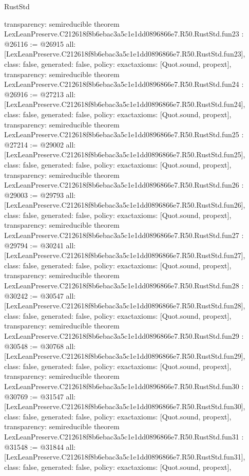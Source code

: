 \begin{lexlean}{RustStd}
\begin{coremodule}
{  transparency: semireducible
}
theorem LexLeanPreserve.C212618f8b6ebac3a5c1e1dd0896866e7.R50.RustStd.fun23 : @26116 := @26915 {
  all: [LexLeanPreserve.C212618f8b6ebac3a5c1e1dd0896866e7.R50.RustStd.fun23],
  class: false,
  generated: false,
  policy: exact{axioms: [Quot.sound, propext]},
  transparency: semireducible
}
theorem LexLeanPreserve.C212618f8b6ebac3a5c1e1dd0896866e7.R50.RustStd.fun24 : @26916 := @27213 {
  all: [LexLeanPreserve.C212618f8b6ebac3a5c1e1dd0896866e7.R50.RustStd.fun24],
  class: false,
  generated: false,
  policy: exact{axioms: [Quot.sound, propext]},
  transparency: semireducible
}
theorem LexLeanPreserve.C212618f8b6ebac3a5c1e1dd0896866e7.R50.RustStd.fun25 : @27214 := @29002 {
  all: [LexLeanPreserve.C212618f8b6ebac3a5c1e1dd0896866e7.R50.RustStd.fun25],
  class: false,
  generated: false,
  policy: exact{axioms: [Quot.sound, propext]},
  transparency: semireducible
}
theorem LexLeanPreserve.C212618f8b6ebac3a5c1e1dd0896866e7.R50.RustStd.fun26 : @29003 := @29793 {
  all: [LexLeanPreserve.C212618f8b6ebac3a5c1e1dd0896866e7.R50.RustStd.fun26],
  class: false,
  generated: false,
  policy: exact{axioms: [Quot.sound, propext]},
  transparency: semireducible
}
theorem LexLeanPreserve.C212618f8b6ebac3a5c1e1dd0896866e7.R50.RustStd.fun27 : @29794 := @30241 {
  all: [LexLeanPreserve.C212618f8b6ebac3a5c1e1dd0896866e7.R50.RustStd.fun27],
  class: false,
  generated: false,
  policy: exact{axioms: [Quot.sound, propext]},
  transparency: semireducible
}
theorem LexLeanPreserve.C212618f8b6ebac3a5c1e1dd0896866e7.R50.RustStd.fun28 : @30242 := @30547 {
  all: [LexLeanPreserve.C212618f8b6ebac3a5c1e1dd0896866e7.R50.RustStd.fun28],
  class: false,
  generated: false,
  policy: exact{axioms: [Quot.sound, propext]},
  transparency: semireducible
}
theorem LexLeanPreserve.C212618f8b6ebac3a5c1e1dd0896866e7.R50.RustStd.fun29 : @30548 := @30768 {
  all: [LexLeanPreserve.C212618f8b6ebac3a5c1e1dd0896866e7.R50.RustStd.fun29],
  class: false,
  generated: false,
  policy: exact{axioms: [Quot.sound, propext]},
  transparency: semireducible
}
theorem LexLeanPreserve.C212618f8b6ebac3a5c1e1dd0896866e7.R50.RustStd.fun30 : @30769 := @31547 {
  all: [LexLeanPreserve.C212618f8b6ebac3a5c1e1dd0896866e7.R50.RustStd.fun30],
  class: false,
  generated: false,
  policy: exact{axioms: [Quot.sound, propext]},
  transparency: semireducible
}
theorem LexLeanPreserve.C212618f8b6ebac3a5c1e1dd0896866e7.R50.RustStd.fun31 : @31548 := @31844 {
  all: [LexLeanPreserve.C212618f8b6ebac3a5c1e1dd0896866e7.R50.RustStd.fun31],
  class: false,
  generated: false,
  policy: exact{axioms: [Quot.sound, propext]},
}
\end{coremodule}
\end{lexlean}
